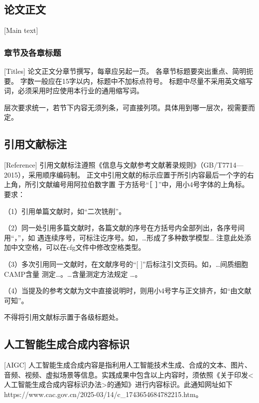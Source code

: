 

\subsection{论文正文}[Main text]
\subsubsection{章节及各章标题}[Titles]
论文正文分章节撰写，每章应另起一页。
各章节标题要突出重点、简明扼要。
字数一般应在15字以内，标题中不加标点符号。
标题中尽量不采用英文缩写词，必须采用时应使用本行业的通用缩写词。


层次要求统一，若节下内容无须列条，可直接列项。具体用到哪一层次，视需要而定。
\subsection{引用文献标注}[Reference]
引用文献标注遵照《信息与文献参考文献著录规则》（GB/T7714—2015），采用顺序编码制。
正文中引用文献的标示应置于所引内容最后一个字的右上角，所引文献编号用阿拉伯数字置
于方括号“［ ］”中，用小4号字体的上角标。
要求：

（1）引用单篇文献时，如“二次铣削\cite{cnproceed}”。

（2）同一处引用多篇文献时，各篇文献的序号在方括号内全部列出，各序号间用“，”，如
遇连续序号，可标注讫序号。如，…形成了多种数学模型\cite{cnarticle,cnproceed}…
注意此处添加中文空格，可以在cfg文件中修改空格类型。

（3）多次引用同一文献时，在文献序号的“[ ]”后标注引文页码。如，…间质细胞CAMP含量
测定\cite[100-197]{cnarticle}…。…含量测定方法规定
\cite[92]{cnarticle}…。

（4）当提及的参考文献为文中直接说明时，则用小4号字与正文排齐，如“由文献可知”。

不得将引用文献标示置于各级标题处。


\subsection{人工智能生成合成内容标识}[AIGC]
人工智能生成合成内容是指利用人工智能技术生成、合成的文本、图片、音频、视频、虚拟场景等信息。实践成果中包含以上内容时，须依照《关于印发<人工智能生成合成内容标识办法>的通知》进行内容标识。此通知网址如下https://www.cac.gov.cn/2025-03/14/c\_1743654684782215.htm。

